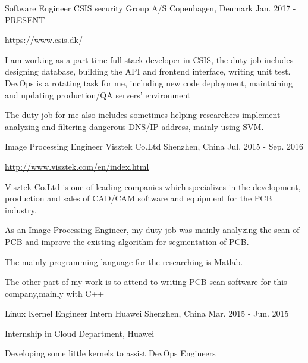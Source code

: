 \begin{cventries}
  \cventry
    {Software Engineer}
    {CSIS security Group A/S}
    {Copenhagen, Denmark}
    {Jan. 2017 - PRESENT}
    {
      \begin{cvitems}
        \item {\url{https://www.csis.dk/}}
        \item {I am working as a part-time full stack developer in CSIS, the duty job includes designing database, building the API and frontend interface, writing unit test. DevOps is a rotating task for me, including new code deployment, maintaining and updating production/QA servers' environment}
        \item {The duty job for me also includes sometimes helping researchers implement analyzing and filtering dangerous  DNS/IP address, mainly using SVM.}
      \end{cvitems}
    }
  \cventry
    {Image Processing Engineer}
    {Visztek Co.Ltd}
    {Shenzhen, China}
    {Jul. 2015 - Sep. 2016}
    {
      \begin{cvitems}
        \item {\url{http://www.visztek.com/en/index.html}}
        \item {Visztek Co.Ltd is one of leading companies which specializes in the development, production and sales of CAD/CAM software and equipment for the PCB industry.}
        \item {As an Image Processing Engineer, my duty job was mainly analyzing the scan of PCB and improve the existing algorithm for segmentation of PCB.}
        \item {The mainly programming language for the researching is Matlab.}
        \item {The other part of my work is to attend to writing PCB scan software for this company,mainly with C++}
      \end{cvitems}
    }
  \cventry
    {Linux Kernel Engineer Intern}
    {Huawei}
    {Shenzhen, China}
    {Mar. 2015 - Jun. 2015}
    {
	\begin{cvitems}
	  \item {Internship in Cloud Department, Huawei}
	  \item {Developing some little kernels to assist DevOps Engineers}
	\end{cvitems}
    }
\end{cventries}
